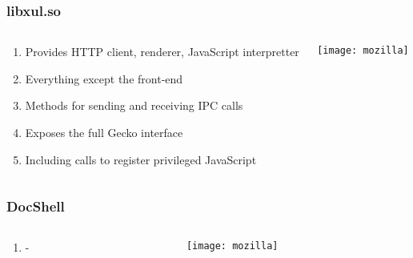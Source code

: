 \documentclass[
	notes=none,
	aspectratio=169
]{beamer}
\begin{document}
\begin{frame}
\frametitle{libxul.so}

\begin{columns}[T]
\begin{column}[T]{0.5\textwidth}
\setlength{\parskip}{0.5em}

\vspace{1.5cm}
\begin{enumerate}
\setlength{\parskip}{0.5em}
\item Provides HTTP client, renderer, JavaScript interpretter
\item Everything except the front-end
\item Methods for sending and receiving IPC calls
\item Exposes the full Gecko interface
\item Including calls to register privileged JavaScript
\end{enumerate}

\end{column}
\begin{column}[T]{0.5\textwidth}
\setlength{\parskip}{0.5em}

\vspace{0.5cm}
\texttt{[image: mozilla]}

\end{column}
\end{columns}

\end{frame}
\note{
\begin{enumerate}
\item -
\end{enumerate}
}


\begin{frame}
\frametitle{DocShell}

\begin{columns}[T]
\begin{column}[T]{0.5\textwidth}
\setlength{\parskip}{0.5em}

\vspace{1.5cm}
\begin{enumerate}
\setlength{\parskip}{0.5em}
\item -
\end{enumerate}

\end{column}
\begin{column}[T]{0.5\textwidth}
\setlength{\parskip}{0.5em}

\vspace{0.5cm}
\texttt{[image: mozilla]}

\end{column}
\end{columns}

\end{frame}
\note{
\begin{enumerate}
\item -
\end{enumerate}
}
\end{document}
